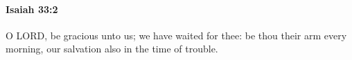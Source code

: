 
		\paragraph{Isaiah 33:2} %
			\label{ISAIAH-33-2}

			O LORD, be gracious unto us; we have waited for thee: be thou their arm every morning, our salvation also in the time of trouble.


